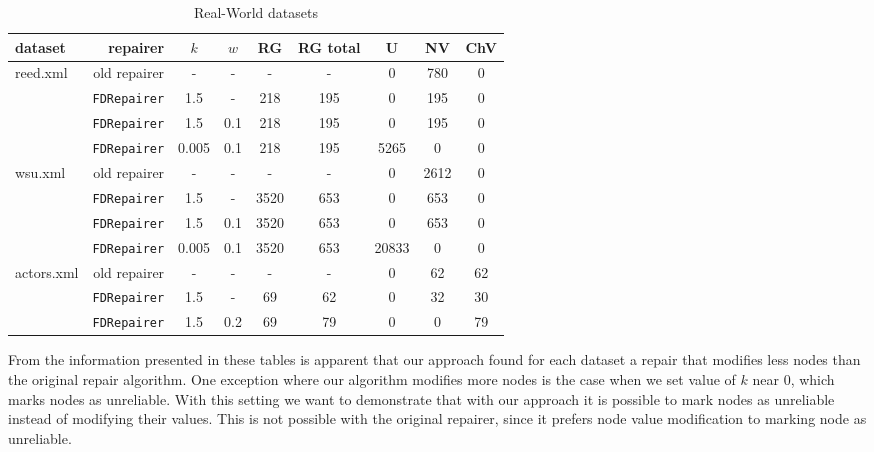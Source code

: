 \begin{table}
    \begin{tabular}{| l | r | *{7}{c|}}
    \hline
    dataset & repairer & $k$ & $w$ & RG & RG total & U & NV & ChV\\ \hline
    \multirow{4}{*}{reed.xml} & old repairer & - & - & - & - & 0 & 780 & 0\\
    & \texttt{FDRepairer} & 1.5 & - & 218 & 195 & 0 & 195 & 0\\
    & \texttt{FDRepairer} & 1.5 & 0.1 & 218 & 195 & 0 & 195 & 0\\
    & \texttt{FDRepairer} & 0.005 & 0.1 & 218 & 195 & 5265 & 0 & 0\\ \hline
    \multirow{4}{*}{wsu.xml} & old repairer & - & - & - & - & 0 & 2612 & 0\\
    & \texttt{FDRepairer} & 1.5 & - & 3520 & 653 & 0 & 653 & 0\\
    & \texttt{FDRepairer} & 1.5 & 0.1 & 3520 & 653 & 0 & 653 & 0\\
    & \texttt{FDRepairer} & 0.005 & 0.1 & 3520 & 653 & 20833 & 0 & 0\\ \hline
    \multirow{3}{*}{actors.xml} & old repairer & - & - & - & - & 0 & 62 & 62\\
    & \texttt{FDRepairer} & 1.5 & - & 69 & 62 & 0 & 32 & 30\\
    & \texttt{FDRepairer} & 1.5 & 0.2 & 69 & 79 & 0 & 0 & 79\\ \hline
    \end{tabular}
\caption{Real-World datasets}
\label{realWorldTable}
\end{table}

From the information presented in these tables is apparent that our approach found for each dataset a repair that modifies less nodes than the original repair algorithm. One exception where our algorithm modifies more nodes is the case when we set value of $k$ near 0, which marks nodes as unreliable. With this setting we want to demonstrate that with our approach it is possible to mark nodes as unreliable instead of modifying their values. This is not possible with the original repairer, since it prefers node value modification to marking node as unreliable.

